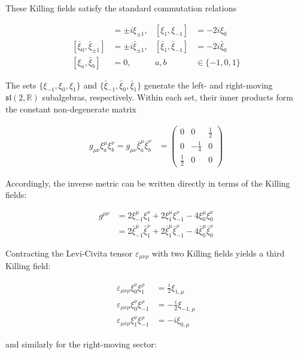 These Killing fields satisfy the standard commutation relations

\begin{align}
[\xi _{0},\xi _{\pm 1}] & =\pm i\xi _{\pm 1}, & [\xi _{1},\xi _{-1}] & =-2i\xi _{0} \\
[\bar{\xi}_{0},\bar{\xi}_{\pm 1}] & =\pm i\bar{\xi}_{\pm 1}, & [\bar{\xi}_{1},\bar{\xi}_{-1}] & =-2i\bar{\xi}_{0} \\
[\xi _{a},\bar{\xi}_{b}] & =0, & a,b & \in \{-1,0,1\}
\end{align}

The sets $\{\xi_{-1}, \xi_0, \xi_1\}$ and $\{\bar{\xi}_{-1}, \bar{\xi}_0, \bar{\xi}_1\}$ generate the left- and right-moving $\mathfrak{sl}(2, \mathbb{R})$ subalgebras, respectively. Within each set, their inner products form the constant non-degenerate matrix

\begin{align}
g_{\mu \nu}\xi _{a}^{\mu}\xi _{b}^{\nu}=g_{\mu \nu}\bar{\xi}_{a}^{\mu}\bar{\xi}_{b}^{\nu} & =\begin{pmatrix}
0 & 0 & \frac{1}{2} \\
0 & -\frac{1}{4} & 0 \\
\frac{1}{2} & 0 & 0
\end{pmatrix}
\end{align}

Accordingly, the inverse metric can be written directly in terms of the Killing fields:

\begin{align}
g^{\mu \nu} & =2\xi _{-1}^{\mu}\xi _{1}^{\nu}+2\xi _{1}^{\mu}\xi _{-1}^{\nu}-4\xi _{0}^{\mu}\xi _{0}^{\nu} \\
 & =2\bar{\xi}_{-1}^{\mu}\bar{\xi}_{1}^{\nu}+2\bar{\xi}_{1}^{\mu}\bar{\xi}_{-1}^{\nu}-4\bar{\xi}_{0}^{\mu}\bar{\xi}_{0}^{\nu}
\end{align}

Contracting the Levi-Civita tensor $\varepsilon _{\mu \nu \rho}$ with two Killing fields yields a third Killing field:

\begin{align}
\varepsilon _{\mu \nu \rho}\xi _{0}^{\nu}\xi _{1}^{\rho} & =\frac{i}{2}\xi _{1,\mu} \\
\varepsilon _{\mu \nu \rho}\xi _{0}^{\nu}\xi _{-1}^{\rho} & =-\frac{i}{2}\xi _{-1,\mu} \\
\varepsilon _{\mu \nu \rho}\xi _{1}^{\nu}\xi _{-1}^{\rho} & =-i\xi _{0,\mu}
\end{align}

and similarly for the right-moving sector:


